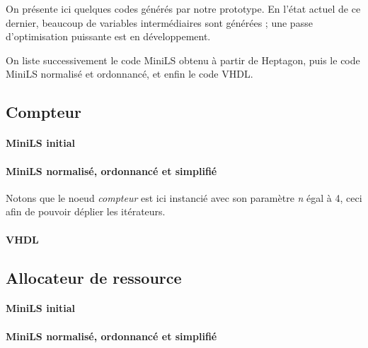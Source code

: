 \documentclass[9pt,a4paper]{article}
\newcommand{\LANG}{Heptagon}
\begin{document}
On présente ici quelques codes générés par notre prototype. En l'état actuel de
ce dernier, beaucoup de variables intermédiaires sont générées ; une passe
d'optimisation puissante est en développement.

On liste successivement le code MiniLS obtenu à partir de \LANG{}, puis le code
MiniLS normalisé et ordonnancé, et enfin le code VHDL.

\subsection{Compteur}

\paragraph{MiniLS initial}

\small

\normalsize

\paragraph{MiniLS normalisé, ordonnancé et simplifié}

Notons que le noeud \textit{compteur} est ici instancié avec son paramètre
\textit{n} égal à 4, ceci afin de pouvoir déplier les itérateurs.

\small

\normalsize

\paragraph{VHDL}

\small

\normalsize

\subsection{Allocateur de ressource}

\paragraph{MiniLS initial}

\small

\normalsize

\paragraph{MiniLS normalisé, ordonnancé et simplifié}

\small

\normalsize
\end{document}
